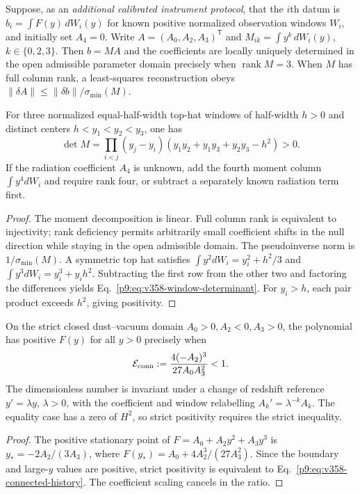 \documentclass[12pt,a4paper]{article}
\begin{document}
\begin{theorem}
\label{p9:thm:v358-window-reconstruction}
Suppose, as an \emph{additional calibrated instrument protocol},
that the $i$th datum is $b_i=\int F(y)\,dW_i(y)$ for known positive
normalized observation windows $W_i$, and initially set $A_4=0$.
Write $A=(A_0,A_2,A_3)^\mathsf T$ and
$M_{ik}=\int y^k\,dW_i(y)$, $k\in\{0,2,3\}$.  Then
$b=MA$ and the coefficients are locally uniquely determined in the
open admissible parameter domain precisely when $\operatorname{rank}M=3$.
When $M$ has full column rank, a least-squares reconstruction obeys
$\|\delta A\|\le\|\delta b\|/\sigma_{\min}(M)$.

For three normalized equal-half-width top-hat windows of half-width
$h>0$ and distinct centers $h<y_1<y_2<y_3$, one has
\begin{equation}
\label{p9:eq:v358-window-determinant}
\det M=\prod_{i<j}(y_j-y_i)
\left(y_1y_2+y_1y_3+y_2y_3-h^2\right)>0.
\end{equation}
If the radiation coefficient $A_4$ is unknown, add the fourth
moment column $\int y^4dW_i$ and require rank four, or subtract a
separately known radiation term first.
\end{theorem}
\begin{proof}
The moment decomposition is linear.  Full column rank is equivalent
to injectivity; rank deficiency permits arbitrarily small
coefficient shifts in the null direction while staying in the
open admissible domain.  The pseudoinverse norm is
$1/\sigma_{\min}(M)$.  A symmetric top hat satisfies
$\int y^2dW_i=y_i^2+h^2/3$ and
$\int y^3dW_i=y_i^3+y_ih^2$.
Subtracting the first row from the other two and factoring the
differences yields Eq.~\eqref{p9:eq:v358-window-determinant}.
For $y_i>h$, each pair product exceeds $h^2$, giving positivity.
\end{proof}

\begin{corollary}
\label{p9:cor:v358-observer-invariant-history}
On the strict closed dust--vacuum domain $A_0>0,A_2<0,A_3>0$,
the polynomial has positive $F(y)$ for all $y>0$ precisely when
\begin{equation}
\label{p9:eq:v358-connected-history}
 \mathcal E_{\rm conn}:=\frac{4(-A_2)^3}{27A_0A_3^2}<1.
\end{equation}
The dimensionless number is invariant under a change of redshift
reference $y'=\lambda y$, $\lambda>0$, with the coefficient and
window relabelling $A_k'=\lambda^{-k}A_k$.  The equality case has a
zero of $H^2$, so strict positivity requires the strict inequality.
\end{corollary}
\begin{proof}
The positive stationary point of $F=A_0+A_2y^2+A_3y^3$ is
$y_*=-2A_2/(3A_3)$, where
$F(y_*)=A_0+4A_2^3/(27A_3^2)$.  Since the boundary
and large-$y$ values are positive, strict positivity is equivalent
to Eq.~\eqref{p9:eq:v358-connected-history}.
The coefficient scaling cancels in the ratio.
\end{proof}
\end{document}
